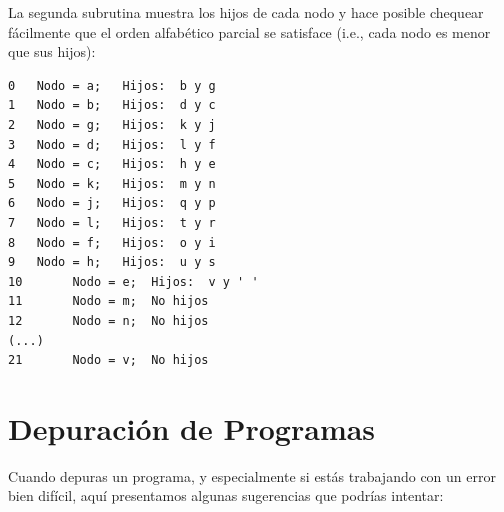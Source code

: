La segunda subrutina muestra los hijos de cada nodo y hace
posible chequear fácilmente que el orden alfabético parcial
se satisface (i.e., cada nodo es menor que sus hijos):

\begin{verbatim}
0	Nodo = a;	Hijos:  b y g
1	Nodo = b;	Hijos:  d y c
2	Nodo = g;	Hijos:  k y j
3	Nodo = d;	Hijos:  l y f
4	Nodo = c;	Hijos:  h y e
5	Nodo = k;	Hijos:  m y n
6	Nodo = j;	Hijos:  q y p
7	Nodo = l;	Hijos:  t y r
8	Nodo = f;	Hijos:  o y i
9	Nodo = h;	Hijos:  u y s
10       Nodo = e;	Hijos:  v y ' '
11       Nodo = m;	No hijos
12       Nodo = n;	No hijos
(...)
21       Nodo = v;	No hijos
\end{verbatim}



\section{Depuración de Programas}

Cuando depuras un programa, y especialmente si estás 
trabajando con un error bien difícil, aquí presentamos
algunas sugerencias que podrías intentar:


